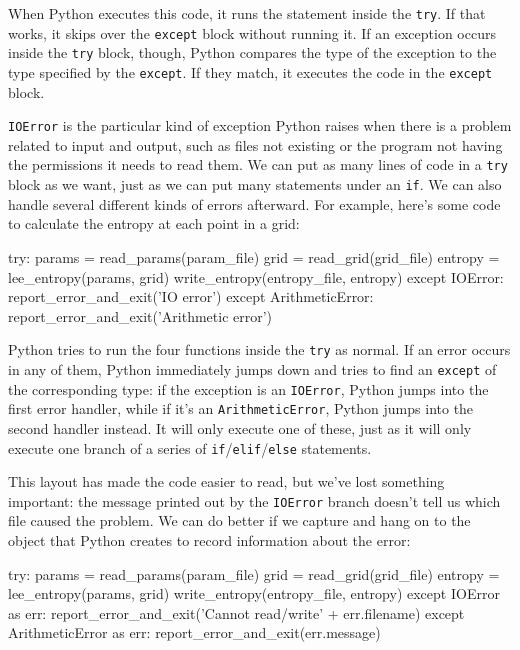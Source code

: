 When Python executes this code, it runs the statement inside the
\texttt{try}. If that works, it skips over the \texttt{except} block
without running it. If an exception occurs inside the \texttt{try}
block, though, Python compares the type of the exception to the type
specified by the \texttt{except}. If they match, it executes the code in
the \texttt{except} block.

\texttt{IOError} is the particular kind of exception Python raises when
there is a problem related to input and output, such as files not
existing or the program not having the permissions it needs to read
them. We can put as many lines of code in a \texttt{try} block as we
want, just as we can put many statements under an \texttt{if}. We can
also handle several different kinds of errors afterward. For example,
here's some code to calculate the entropy at each point in a grid:

\begin{VerbIn}
try:
    params = read_params(param_file)
    grid = read_grid(grid_file)
    entropy = lee_entropy(params, grid)
    write_entropy(entropy_file, entropy)
except IOError:
    report_error_and_exit('IO error')
except ArithmeticError:
    report_error_and_exit('Arithmetic error')
\end{VerbIn}

Python tries to run the four functions inside the \texttt{try} as
normal. If an error occurs in any of them, Python immediately jumps down
and tries to find an \texttt{except} of the corresponding type: if the
exception is an \texttt{IOError}, Python jumps into the first error
handler, while if it's an \texttt{ArithmeticError}, Python jumps into
the second handler instead. It will only execute one of these, just as
it will only execute one branch of a series of
\texttt{if}/\texttt{elif}/\texttt{else} statements.

This layout has made the code easier to read, but we've lost something
important: the message printed out by the \texttt{IOError} branch
doesn't tell us which file caused the problem. We can do better if we
capture and hang on to the object that Python creates to record
information about the error:

\begin{VerbIn}
try:
    params = read_params(param_file)
    grid = read_grid(grid_file)
    entropy = lee_entropy(params, grid)
    write_entropy(entropy_file, entropy)
except IOError as err:
    report_error_and_exit('Cannot read/write' + err.filename)
except ArithmeticError as err:
    report_error_and_exit(err.message)
\end{VerbIn}

